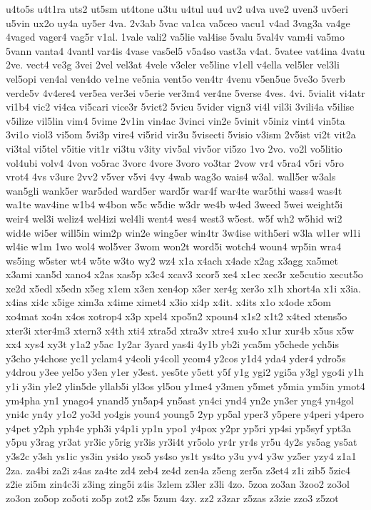 {u4to5s
u4t1ra
uts2
ut5sm
ut4tone
u3tu
u4tul
uu4
uv2
u4va
uve2
uven3
uv5eri
u5vin
ux2o
uy4a
uy5er
4va.
2v3ab
5vac
va1ca
va5ceo
vacu1
v4ad
3vag3a
va4ge
4vaged
vager4
vag5r
v1al.
1vale
vali2
va5lie
val4ise
5valu
5val4v
vam4i
va5mo
5vann
vanta4
4vantl
var4is
4vase
vas5el5
v5a4so
vast3a
v4at.
5vatee
vat4ina
4vatu
2ve.
vect4
ve3g
3vei
2vel
vel3at
4vele
v3eler
ve5line
v1ell
v4ella
vel5ler
vel3li
vel5opi
ven4al
ven4do
ve1ne
ve5nia
vent5o
ven4tr
4venu
v5en5ue
5ve3o
5verb
verde5v
4v4ere4
ver5ea
ver3ei
v5erie
ver3m4
ver4ne
5verse
4ves.
4vi.
5vialit
vi4atr
vi1b4
vic2
vi4ca
vi5cari
vice3r
5vict2
5vicu
5vider
vign3
vi4l
vil3i
3vili4a
v5ilise
v5ilize
vil5lin
vim4
5vime
2v1in
vin4ac
3vinci
vin2e
5vinit
v5iniz
vint4
vin5ta
3vi1o
viol3
vi5om
5vi3p
vire4
vi5rid
vir3u
5visecti
5visio
v3ism
2v5ist
vi2t
vit2a
vi3tal
vi5tel
v5itie
vit1r
vi3tu
v3ity
viv5al
viv5or
vi5zo
1vo
2vo.
vo2l
vo5litio
vol4ubi
volv4
4von
vo5rac
3vorc
4vore
3voro
vo3tar
2vow
vr4
v5ra4
v5ri
v5ro
vrot4
4vs
v3ure
2vv2
v5ver
v5vi
4vy
4wab
wag3o
wais4
w3al.
wall5er
w3als
wan5gli
wank5er
war5ded
ward5er
ward5r
war4f
war4te
war5thi
wass4
was4t
wa1te
wav4ine
w1b4
w4bon
w5c
w5die
w3dr
we4b
w4ed
3weed
5wei
weight5i
weir4
wel3i
weliz4
wel4izi
wel4li
went4
wes4
west3
w5est.
w5f
wh2
w5hid
wi2
wid4e
wi5er
will5in
wim2p
win2e
wing5er
win4tr
3w4ise
with5eri
w3la
wl1er
wl1i
wl4ie
w1m
1wo
wol4
wol5ver
3wom
won2t
word5i
wotch4
woun4
wp5in
wra4
ws5ing
w5ster
wt4
w5te
w3to
wy2
wz4
x1a
x4ach
x4ade
x2ag
x3agg
xa5met
x3ami
xan5d
xano4
x2as
xas5p
x3c4
xcav3
xcor5
xe4
x1ec
xec3r
xe5cutio
xecut5o
xe2d
x5edl
x5edn
x5eg
x1em
x3en
xen4op
x3er
xer4g
xer3o
x1h
xhort4a
x1i
x3ia.
x4ias
xi4c
x5ige
xim3a
x4ime
ximet4
x3io
xi4p
x4it.
x4its
x1o
x4ode
x5om
xo4mat
xo4n
x4os
xotrop4
x3p
xpel4
xpo5n2
xpoun4
x1s2
x1t2
x4ted
xtens5o
xter3i
xter4m3
xtern3
x4th
xti4
xtra5d
xtra3v
xtre4
xu4o
x1ur
xur4b
x5us
x5w
xx4
xys4
xy3t
y1a2
y5ac
1y2ar
3yard
yas4i
4y1b
yb2i
yca5m
y5chede
ych5is
y3cho
y4chose
yc1l
yclam4
y4coli
y4coll
ycom4
y2cos
y1d4
yda4
yder4
ydro5s
y4drou
y3ee
yel5o
y3en
y1er
y3est.
yes5te
y5ett
y5f
y1g
ygi2
ygi5a
y3gl
ygo4i
y1h
y1i
y3in
yle2
ylin5de
yllab5i
yl3os
yl5ou
y1me4
y3men
y5met
y5mia
ym5in
ymot4
ym4pha
yn1
ynago4
ynand5
yn5ap4
yn5ast
yn4ci
ynd4
yn2e
yn3er
yng4
yn4gol
yni4c
yn4y
y1o2
yo3d
yo4gis
youn4
young5
2yp
yp5al
yper3
y5pere
y4peri
y4pero
y4pet
y2ph
yph4e
yph3i
y4p1i
yp1n
ypo1
y4pox
y2pr
yp5ri
yp4si
yp5syf
ypt3a
y5pu
y3rag
yr3at
yr3ic
y5rig
yr3is
yr3i4t
yr5olo
yr4r
yr4s
yr5u
4y2s
ys5ag
ys5at
y3s2c
y3sh
ys1ic
ys3in
ysi4o
yso5
ys4so
ys1t
ys4to
y3u
yv4
y3w
yz5er
yzy4
z1a1
2za.
za4bi
za2i
z4as
za4te
zd4
zeb4
ze4d
zen4a
z5eng
zer5a
z3et4
z1i
zib5
5zic4
z2ie
zi5m
zin4c3i
z3ing
zing5i
z4is
3zlem
z3ler
z3li
4zo.
5zoa
zo3an
3zoo2
zo3ol
zo3on
zo5op
zo5oti
zo5p
zot2
z5s
5zum
4zy.
zz2
z3zar
z5zas
z3zie
zzo3
z5zot
}
